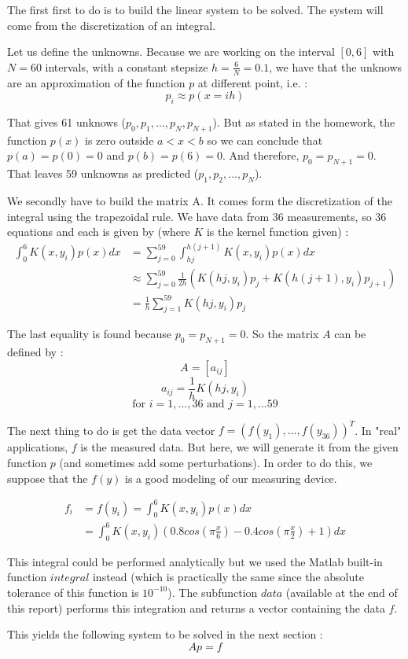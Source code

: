 The first first to do is to build the linear system to be solved. The system will come from the discretization of an integral. 

Let us define the unknowns. Because we are working on the interval $[0,6]$ with $N=60$ intervals, with a constant stepsize $h=\frac{6}{N}=0.1$, we have that the unknows are an approximation of the function $p$ at different point, i.e. : 
$$p_i \approx p(x=ih)$$

That gives 61 unknows ($p_0,p_1,...,p_N,p_{N+1}$). But as stated in the homework, the function $p(x)$ is zero outside $a<x<b$ so we can conclude that $p(a)=p(0)=0$ and $p(b)=p(6)=0$. And therefore, $p_0=p_{N+1}=0$. That leaves 59 unknowns as predicted ($p_1,p_2,...,p_N$).

We secondly have to build the matrix A. It comes form the discretization of the integral using the trapezoidal rule. We have data from 36 measurements, so 36 equations and each is given by (where $K$ is the kernel function given) : 
\begin{align*}
\int_0^{6}K(x,y_i)p(x)dx &=\sum_{j=0}^{59} \int^{h(j+1)}_{hj} K(x,y_i)p(x)dx\\
&\approx \sum_{j=0}^{59} \frac{1}{2h}(K(hj,y_i)p_j+K(h(j+1),y_i)p_{j+1})\\
&=\frac{1}{h}\sum_{j=1}^{59} K(hj,y_i)p_j
\end{align*}

The last equality is found because $p_0=p_{N+1}=0$. So the matrix $A$ can be defined by : 
$$A=[a_{ij}]$$
$$a_{ij} = \frac{1}{h}K(hj,y_i)$$
$$\text{for }i=1,...,36 \text{ and }j=1,...59$$

The next thing to do is get the data vector $f=(f(y_1),...,f(y_{36}))^T$. In "real" applications, $f$ is the measured data. But here, we will generate it from the given function $p$ (and sometimes add some perturbations). In order to do this, we suppose that the $f(y)$ is a good modeling of our measuring device.

\begin{align*}
f_i&=f(y_i)=\int_0^{6}K(x,y_i)p(x)dx\\
&=\int_0^{6}K(x,y_i)(0.8cos(\pi\frac{x}{6})-0.4cos(\pi\frac{x}{2})+1)dx
\end{align*}

This integral could be performed analytically but we used the Matlab built-in function $integral$ instead (which is practically the same since the absolute tolerance of this function is $10^{-10}$). The subfunction $data$ (available at the end of this report) performs this integration and returns a vector containing the data $f$.

This yields the following system to be solved in the next section : 
$$Ap=f$$
